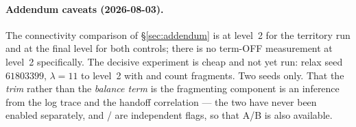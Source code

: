 \documentclass[11pt,a4paper]{article}
\begin{document}
\paragraph{Addendum caveats (2026-08-03).} The connectivity comparison of
\S\ref{sec:addendum} is at level~2 for the territory run and at the final level for
both controls; there is no term-OFF measurement at level~2 specifically. The
decisive experiment is cheap and not yet run: relax seed \(61803399\),
\(\lambda{=}11\) to level~2 with  and count fragments.
Two seeds only. That the \emph{trim} rather than the \emph{balance term} is the
fragmenting component is an inference from the log trace and the handoff
correlation --- the two have never been enabled separately, and
 /  are independent flags, so
that A/B is also available.
\end{document}
